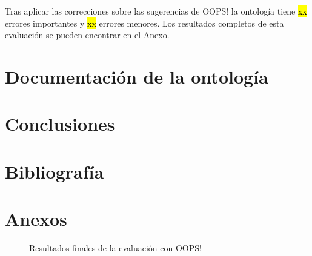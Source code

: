 \documentclass[a4paper,12pt]{article}
\begin{document}
	Tras aplicar las correcciones sobre las sugerencias de OOPS! la ontología tiene \hl{xx} errores importantes y \hl{xx} errores menores.
	Los resultados completos de esta evaluación se pueden encontrar en el Anexo.
	
	\section{Documentación de la ontología}
		
	\cite{widoco}
	
	
	\section{Conclusiones}
	
	
\newpage
	\section*{Bibliografía}
	
	
	
	\newpage
	\section*{Anexos}
	\begin{figure}[H]
		\centering
		\caption{Resultados finales de la evaluación con OOPS!}
	\end{figure}
\end{document}
